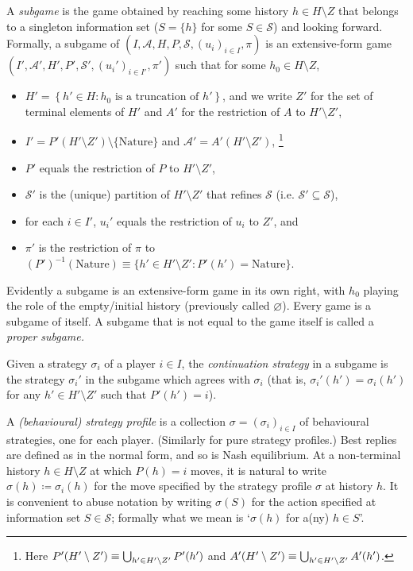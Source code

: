 \documentclass[11pt,letterpaper,reqno,oneside]{book}
\begin{document}
A \emph{subgame} is the game obtained by reaching some history $h \in H \setminus Z$ that belongs to a singleton information set ($S = \{h\}$ for some $S \in \mathcal{S}$) and looking forward. Formally, a subgame of $(I,\mathcal{A},H,P,\mathcal{S},(u_i)_{i \in I},\pi)$ is an extensive-form game $(I',\mathcal{A}',H',P',\mathcal{S}',(u_i')_{i \in I'},\pi')$ such that for some $h_0 \in H \setminus Z$,
%
\begin{itemize}

	\item $H' = \left\{ h' \in H : \text{$h_0$ is a truncation of $h'$} \right\}$, and we write $Z'$ for the set of terminal elements of $H'$ and $A'$ for the restriction of $A$ to $H' \setminus Z'$,

	\item $I' = P'\left( H' \setminus Z' \right) \setminus \{\text{Nature}\}$ and $\mathcal{A'} = A'\left( H' \setminus Z' \right)$,%
		\footnote{Here $P'\left( H' \setminus Z' \right) \equiv \Union_{h' \in H' \setminus Z'} P'(h')$ and $A'\left( H' \setminus Z' \right) \equiv \Union_{h' \in H' \setminus Z'} A'(h')$.}

	\item $P'$ equals the restriction of $P$ to $H' \setminus Z'$,

	\item $\mathcal{S}'$ is the (unique) partition of $H' \setminus Z'$ that refines $\mathcal{S}$ (i.e. $\mathcal{S}' \subseteq \mathcal{S}$),

	\item for each $i \in I'$, $u_i'$ equals the restriction of $u_i$ to $Z'$, and

	\item $\pi'$ is the restriction of $\pi$ to $(P')^{-1}(\text{Nature}) \equiv \{ h' \in H' \setminus Z' : P'(h') = \text{Nature} \}$.

\end{itemize}
%
Evidently a subgame is an extensive-form game in its own right, with $h_0$ playing the role of the empty/initial history (previously called $\varnothing$). Every game is a subgame of itself. A subgame that is not equal to the game itself is called a \emph{proper subgame.}

Given a strategy $\sigma_i$ of a player $i \in I$, the \emph{continuation strategy} in a subgame is the strategy $\sigma_i'$ in the subgame which agrees with $\sigma_i$ (that is, $\sigma_i'(h') = \sigma_i(h')$ for any $h' \in H' \setminus Z'$ such that $P'(h') = i$).

A \emph{(behavioural) strategy profile} is a collection $\sigma = (\sigma_i)_{i \in I}$ of behavioural strategies, one for each player. (Similarly for pure strategy profiles.) Best replies are defined as in the normal form, and so is Nash equilibrium. At a non-terminal history $h \in H \setminus Z$ at which $P(h)=i$ moves, it is natural to write $\sigma(h) \coloneqq \sigma_i(h)$ for the move specified by the strategy profile $\sigma$ at history $h$. It is convenient to abuse notation by writing $\sigma(S)$ for the action specified at information set $S \in \mathcal{S}$; formally what we mean is `$\sigma(h)$ for a(ny) $h \in S$'.
\end{document}
